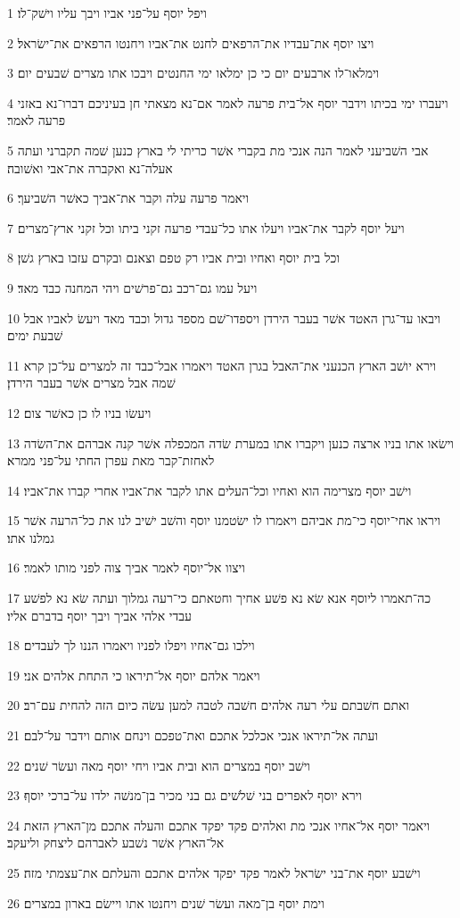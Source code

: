 \par 1 ויפל יוסף על־פני אביו ויבך עליו וישׁק־לו׃
\par 2 ויצו יוסף את־עבדיו את־הרפאים לחנט את־אביו ויחנטו הרפאים את־ישׂראל׃
\par 3 וימלאו־לו ארבעים יום כי כן ימלאו ימי החנטים ויבכו אתו מצרים שׁבעים יום׃
\par 4 ויעברו ימי בכיתו וידבר יוסף אל־בית פרעה לאמר אם־נא מצאתי חן בעיניכם דברו־נא באזני פרעה לאמר׃
\par 5 אבי השׁביעני לאמר הנה אנכי מת בקברי אשׁר כריתי לי בארץ כנען שׁמה תקברני ועתה אעלה־נא ואקברה את־אבי ואשׁובה׃
\par 6 ויאמר פרעה עלה וקבר את־אביך כאשׁר השׁביעך׃
\par 7 ויעל יוסף לקבר את־אביו ויעלו אתו כל־עבדי פרעה זקני ביתו וכל זקני ארץ־מצרים׃
\par 8 וכל בית יוסף ואחיו ובית אביו רק טפם וצאנם ובקרם עזבו בארץ גשׁן׃
\par 9 ויעל עמו גם־רכב גם־פרשׁים ויהי המחנה כבד מאד׃
\par 10 ויבאו עד־גרן האטד אשׁר בעבר הירדן ויספדו־שׁם מספד גדול וכבד מאד ויעשׂ לאביו אבל שׁבעת ימים׃
\par 11 וירא יושׁב הארץ הכנעני את־האבל בגרן האטד ויאמרו אבל־כבד זה למצרים על־כן קרא שׁמה אבל מצרים אשׁר בעבר הירדן׃
\par 12 ויעשׂו בניו לו כן כאשׁר צום׃
\par 13 וישׂאו אתו בניו ארצה כנען ויקברו אתו במערת שׂדה המכפלה אשׁר קנה אברהם את־השׂדה לאחזת־קבר מאת עפרן החתי על־פני ממרא׃
\par 14 וישׁב יוסף מצרימה הוא ואחיו וכל־העלים אתו לקבר את־אביו אחרי קברו את־אביו׃
\par 15 ויראו אחי־יוסף כי־מת אביהם ויאמרו לו ישׂטמנו יוסף והשׁב ישׁיב לנו את כל־הרעה אשׁר גמלנו אתו׃
\par 16 ויצוו אל־יוסף לאמר אביך צוה לפני מותו לאמר׃
\par 17 כה־תאמרו ליוסף אנא שׂא נא פשׁע אחיך וחטאתם כי־רעה גמלוך ועתה שׂא נא לפשׁע עבדי אלהי אביך ויבך יוסף בדברם אליו׃
\par 18 וילכו גם־אחיו ויפלו לפניו ויאמרו הננו לך לעבדים׃
\par 19 ויאמר אלהם יוסף אל־תיראו כי התחת אלהים אני׃
\par 20 ואתם חשׁבתם עלי רעה אלהים חשׁבה לטבה למען עשׂה כיום הזה להחית עם־רב׃
\par 21 ועתה אל־תיראו אנכי אכלכל אתכם ואת־טפכם וינחם אותם וידבר על־לבם׃
\par 22 וישׁב יוסף במצרים הוא ובית אביו ויחי יוסף מאה ועשׂר שׁנים׃
\par 23 וירא יוסף לאפרים בני שׁלשׁים גם בני מכיר בן־מנשׁה ילדו על־ברכי יוסף׃
\par 24 ויאמר יוסף אל־אחיו אנכי מת ואלהים פקד יפקד אתכם והעלה אתכם מן־הארץ הזאת אל־הארץ אשׁר נשׁבע לאברהם ליצחק וליעקב׃
\par 25 וישׁבע יוסף את־בני ישׂראל לאמר פקד יפקד אלהים אתכם והעלתם את־עצמתי מזה׃
\par 26 וימת יוסף בן־מאה ועשׂר שׁנים ויחנטו אתו ויישׂם בארון במצרים׃


